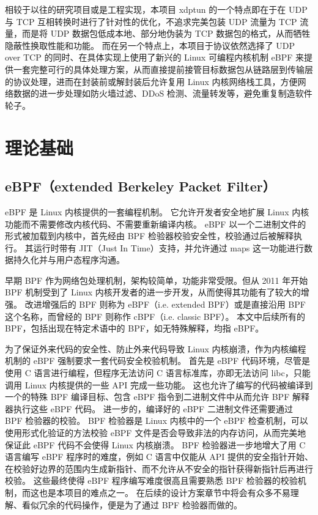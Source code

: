 相较于以往的研究项目或是工程实现，本项目 xdptun 的一个特点即在于在 UDP 与 TCP 互相转换时进行了针对性的优化，不追求完美包装 UDP 流量为 TCP 流量，而是将 UDP 数据包低成本地、部分地伪装为 TCP 数据包的格式，从而牺牲隐蔽性换取性能和功能。
而在另一个特点上，本项目于协议依然选择了 UDP over TCP 的同时、在具体实现上使用了新兴的 Linux 可编程内核机制 eBPF 来提供一套完整可行的具体处理方案，从而直接提前接管目标数据包从链路层到传输层的协议处理，进而在封装前或解封装后允许复用 Linux 内核网络栈工具，方便网络数据的进一步处理如防火墙过滤、DDoS 检测、流量转发等，避免重复制造软件轮子。

\chapter{理论基础}

\section{eBPF（extended Berkeley Packet Filter）}

eBPF\cite{10.1145/3371038} 是 Linux 内核提供的一套编程机制。
它允许开发者安全地扩展 Linux 内核功能而不需要修改内核代码、不需要重新编译内核。
eBPF 以一个二进制文件的形式被加载到内核中，首先经由 BPF 检验器校验安全性，校验通过后被解释执行。
其运行时带有 JIT（Just In Time）支持，并允许通过 maps 这一功能进行数据持久化并与用户态程序沟通。

早期 BPF 作为网络包处理机制，架构较简单，功能非常受限。但从 2011 年开始 BPF 机制受到了 Linux 内核开发者的进一步开发，从而使得其功能有了较大的增强。
改进增强后的 BPF 则称为 eBPF（i.e. extended BPF）或是直接沿用 BPF 这个名称，而曾经的 BPF 则称作 cBPF（i.e. classic BPF）\cite{10.1145/3371038}。
本文中后续所有的 BPF，包括出现在特定术语中的 BPF，如无特殊解释，均指 eBPF。

为了保证外来代码的安全性、防止外来代码导致 Linux 内核崩溃，作为内核编程机制的 eBPF 强制要求一套代码安全校验机制。
首先是 eBPF 代码环境，尽管是使用 C 语言进行编程，但程序无法访问 C 语言标准库，亦即无法访问 libc，只能调用 Linux 内核提供的一些 API 完成一些功能。
这也允许了编写的代码被编译到一个的特殊 BPF 编译目标、包含 eBPF 指令到二进制文件中从而允许 BPF 解释器执行这些 eBPF 代码。
进一步的，编译好的 eBPF 二进制文件还需要通过 BPF 检验器的校验。
BPF 检验器是 Linux 内核中的一个 eBPF 检查机制，可以使用形式化验证的方法校验 eBPF 文件是否会导致非法的内存访问，从而完美地保证此 eBPF 代码不会使得 Linux 内核崩溃。
BPF 检验器进一步地增大了用 C 语言编写 eBPF 程序时的难度，例如 C 语言中仅能从 API 提供的安全指针开始、在校验好边界的范围内生成新指针、而不允许从不安全的指针获得新指针后再进行校验。
这些最终使得 eBPF 程序编写难度很高且需要熟悉 BPF 检验器的校验机制，而这也是本项目的难点之一。
在后续的设计方案章节中将会有众多不易理解、看似冗余的代码操作，便是为了通过 BPF 检验器而做的。

